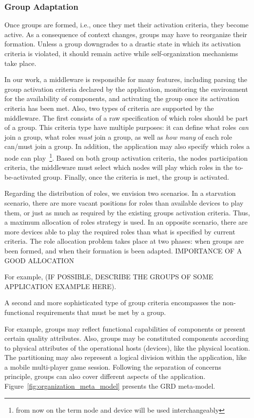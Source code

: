 \subsubsection{Group Adaptation}

Once groups are formed, i.e., once they met their activation criteria, they become active. As a consequence of context changes, groups may have to reorganize their formation. Unless a group downgrades to a drastic state in which its activation criteria is violated, it should remain active while self-organization mechanisms take place. 

In our work, a middleware is responsible for many features, including parsing the group activation criteria declared by the application, monitoring the environment for the availability of components, and activating the group once its activation criteria has been met. Also, two types of criteria are supported by the middleware. The first consists of a raw specification of which roles should be part of a group. This criteria type have multiple purposes: it can define what roles \textit{can} join a group, what roles \textit{must} join a group, as well as \textit{how many} of each role can/must join a group.  In addition, the application may also specify which roles a node can play~\footnote{from now on the term node and device will be used interchangeably}. Based on both group activation criteria, the nodes participation criteria, the middleware must select which nodes will play which roles in the to-be-activated group. Finally, once the criteria is met, the group is activated.

Regarding the distribution of roles, we envision two scenarios. In a starvation scenario, there are more vacant positions for roles than available devices to play them, or just as much as required by the existing groups activation criteria. Thus, a maximum allocation of roles strategy is used. In an opposite scenario, there are more devices able to play the required roles than what is specified by current criteria. The role allocation problem takes place at two phases: when groups are been formed, and when their formation is been adapted. IMPORTANCE OF A GOOD ALLOCATION

For example, (IF POSSIBLE, DESCRIBE THE GROUPS OF SOME APPLICATION EXAMPLE HERE).

A second and more sophisticated type of group criteria encompasses the non-functional requirements that must be met by a group. 

For example, groups may reflect functional capabilities of components or present certain quality attributes. Also, groups may be constituted components according to physical attributes of the operational hosts (devices), like the physical location. The partitioning may also represent a logical division within the application, like a mobile multi-player game session. Following the separation of concerns principle, groups can also cover different aspects of the application. Figure~\ref{fig:organization_meta_model} presents the GRD meta-model.


